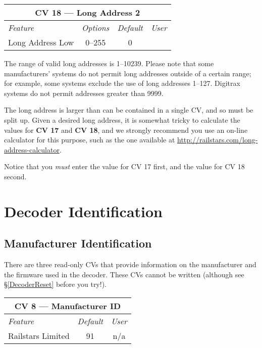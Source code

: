 \documentclass[12pt,letterpaper,draft]{memoir} %
\begin{document}
\label{CV18}
\begin{center}
\begin{tabular}{|l|c|c|c|}
\hline
\multicolumn{4}{|c|}{\textbf{CV 18 --- Long Address 2}} \\ \hline \hline
\textit{Feature} & \textit{Options} & \textit{Default} & \textit{User} \\ \hline
Long Address Low & 0--255 & 0 &\\ \hline
\end{tabular}
\end{center}

The range of valid long addresses is 1--10239. Please note that some manufacturers' systems do not permit long addresses outside of a certain range; for example, some systems exclude the use of long addresses 1--127. Digitrax systems do not permit addresses greater than 9999.

The long address is larger than can be contained in a single CV, and so must be split up. Given a desired long address, it is somewhat tricky to calculate the values for \textbf{CV 17} and \textbf{CV 18}, and we strongly recommend you use an on-line calculator for this purpose, such as the one available at \url{http://railstars.com/long-address-calculator}.

Notice that you \textit{must} enter the value for CV 17 first, and the value for CV 18 second.

\section{Decoder Identification}

\subsection{Manufacturer Identification}
\label{ManufacturerIdentification}
There are three read-only CVs that provide information on the manufacturer and the firmware used in the decoder. These CVs cannot be written (although see \S\ref{DecoderReset} before you try!).

\label{CV8}
\begin{center}
\begin{tabular}{|l|c|c|}
\hline
\multicolumn{3}{|c|}{\textbf{CV 8 --- Manufacturer ID}} \\ \hline \hline
\textit{Feature}& \textit{Default} & \textit{User} \\ \hline
Railstars Limited & 91 & n/a\\ \hline
\end{tabular}
\end{center}
\end{document}
